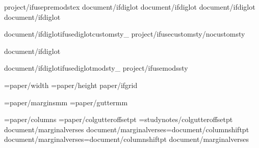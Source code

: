 


{project/ifusepremodstex}
{document/ifdiglot}\diglottrue
{document/ifdiglot}\diglotcolumns
{document/ifdiglot}
{document/ifdiglot}


{document/ifdiglot}{ifusediglotcustomsty_}
{project/ifusecustomsty}{/nocustomsty}

{document/ifdiglot}

{document/ifdiglot}{ifusediglotmodsty_} %
{project/ifusemodssty} %

\PaperWidth={paper/width}
\PaperHeight={paper/height}
{paper/ifgrid}\def\doLines{{{grid/gridgraph}{grid/gridlines}}}

\MarginUnit={paper/margins}mm
\def\TopMarginFactor{{{paper/topmarginfactor}}}
\def\BottomMarginFactor{{{paper/bottommarginfactor}}}
\def\SideMarginFactor{{1.0}}
\BindingGutter={paper/gutter}mm
\def\DefaultSpaceBeside{{{document/cutouterpadding} pt}}

\BodyColumns={paper/columns}\def\mainBodyColumns{{{paper/columns}}}
\def\ColumnGutterFactor{{{document/colgutterfactor}}}
\ColumnGutterRuleSkip={paper/colgutteroffset}pt
\StudyColumnGutterRuleSkip={studynotes/colgutteroffset}pt
\def\StudyGutterFactor{{{studynotes/colgutterfactor}}}
{document/marginalverses}
{document/marginalverses}\columnshift={document/columnshift}pt
{document/marginalverses}\VerseBoxWidth={document/columnshift}pt
{document/marginalverses}\def\colshiftmode{{{document/marginalposn}}}
\def\PageFullFactor{{{document/pagefullfactor}}}
\def\BalanceThreshold{{{paper/bottomrag}}}

